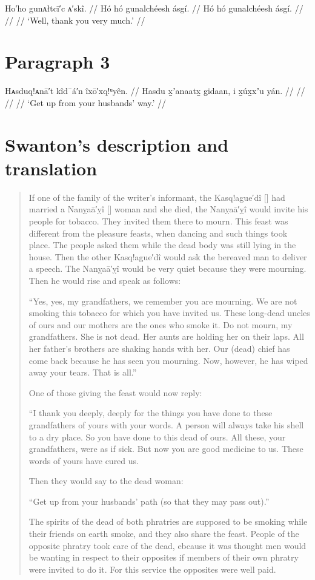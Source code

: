 \ex
\begingl
	\glpreamble	Ho′ho gunᴀłtcī′c ᴀ′skî. //
	\glpreamble	Hó hó gunalchéesh ásgí. //
	\gla	Hó hó gunalchéesh ásgí. //
	\glb	 //
	\glc	 //
	\glft	‘Well, thank you very much.’
		//
\endgl
\xe

\section{Paragraph 3}\label{sec:201-para-3}

\ex
\begingl
	\glpreamble	Hᴀsduq!ᴀnā′t kîd¯á′n îxō′xq!ᵘyên. //
	\glpreamble	Hasdu x̱ʼanaatx̱ gidaan, i x̱úx̱xʼu yán. //
	\gla	 //
	\glb	 //
	\glc	 //
	\glft	‘Get up from your husbands’ way.’
		//
\endgl
\xe


\section{Swanton’s description and translation}\label{sec:201-swanton-translation}

\begin{quote}\small
If one of the family of the writer’s informant, the Kasq!ague′dî [] had married a Nanỵaā′ỵî [] woman and she died, the Nanỵaā′ỵî would invite his people for tobacco.
They invited them there to mourn.
This feast was different from the pleasure feasts, when dancing and such things took place.
The people asked them while the dead body was still lying in the house.
Then the other Kasq!ague′dî would ask the bereaved man to deliver a speech.
The Nanỵaā′ỵî would be very quiet because they were mourning.
Then he would rise and speak as follows:

“Yes, yes, my grandfathers, we remember you are mourning.
We are not smoking this tobacco for which you have invited us.
These long-dead uncles of ours and our mothers are the ones who smoke it.
Do not mourn, my grandfathers.
She is not dead.
Her aunts are holding her on their laps.
All her father’s brothers are shaking hands with her.
Our (dead) chief has come back because he has seen you mourning.
Now, however, he has wiped away your tears.
That is all.”

One of those giving the feast would now reply:

“I thank you deeply, deeply for the things you have done to these grandfathers of yours  with your words.
A person will always take his shell to a dry place.
So you have done to this dead of ours.
All these, your grandfathers, were as if sick.
But now you are good medicine to us.
These words of yours have cured us.

Then they would say to the dead woman:

“Get up from your husbands’ path (so that they may pass out).”

The spirits of the dead of both phratries are supposed to be smoking while their friends on earth smoke, and they also share the feast.
People of the opposite phratry took care of the dead, ebcause it was thought men would be wanting in respect to their opposites if members of their own phratry were invited to do it.
For this service the opposites were well paid.
\end{quote}

